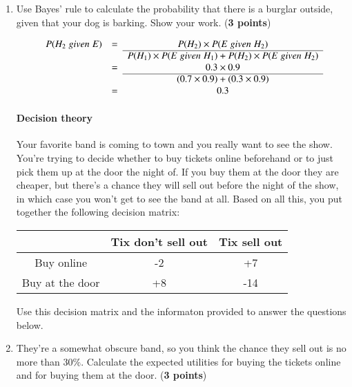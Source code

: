 \documentclass[10pt]{article}
\begin{document}
\begin{enumerate}

\item Use Bayes' rule to calculate the probability that there is a burglar outside, given that your dog is barking. Show your work. (\textbf{3 points})

\[\begin{array}{ccc}
P(H_2\; given \; E) & = & P(H_2) \times P(E\; given\; H_2) \\ \cline{3-3}
 & & P(H_1)\times P(E\; given \; H_1) + P(H_2)\times P(E\; given\; H_2) \\
 & = & 0.3 \times 0.9 \\ \cline{3-3}
 & & (0.7 \times 0.9) + (0.3 \times 0.9) \\
 & = & 0.3 \\
\end{array}\]

\vspace{1cm}

\paragraph{Decision theory}

Your favorite band is coming to town and you really want to see the show. You're trying to decide whether to buy tickets online beforehand or to just pick them up at the door the night of. If you buy them at the door they are cheaper, but there's a chance they will sell out before the night of the show, in which case you won't get to see the band at all. Based on all this, you put together the following decision matrix:

\begin{center}
 \begin{tabular}{c|c|c|}
 & Tix don't sell out & Tix sell out \\ \hline
Buy online & -2 & +7 \\ \hline
Buy at the door & +8 & -14 \\ \hline
\end{tabular}
\end{center}

Use this decision matrix and the informaton provided to answer the questions below.

\setlength\itemsep{1cm}

\item They're a somewhat obscure band, so you think the chance they sell out is no more than $30\%$. Calculate the expected utilities for buying the tickets online and for buying them at the door. (\textbf{3 points})


\end{enumerate}
\end{document}
